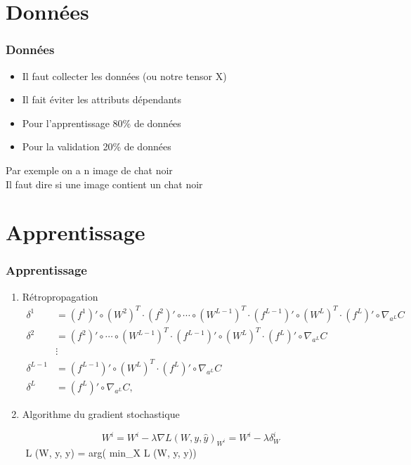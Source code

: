 \documentclass{beamer}
\begin{document}
	\section{Données}

	\begin{frame}
		\frametitle{Données}
		\begin{itemize}
			\item Il faut collecter les données (ou notre tensor X)
			\item Il fait éviter les attributs dépendants
			\item Pour l'apprentissage 80\% de données
			\item Pour la validation 20\% de données
		\end{itemize}
	
		\begin{center}
			Par exemple on a n image de chat noir\\
			Il faut dire si une image contient un chat noir 
		\end{center}
	\end{frame}



		\section{Apprentissage}
	
	\begin{frame}
		\frametitle{Apprentissage}
		\begin{enumerate}
			\item Rétropropagation
		$$	{\displaystyle {\begin{aligned}\delta ^{1}&=(f^{1})'\circ (W^{2})^{T}\cdot (f^{2})'\circ \cdots \circ (W^{L-1})^{T}\cdot (f^{L-1})'\circ (W^{L})^{T}\cdot (f^{L})'\circ \nabla _{a^{L}}C\\\delta ^{2}&=(f^{2})'\circ \cdots \circ (W^{L-1})^{T}\cdot (f^{L-1})'\circ (W^{L})^{T}\cdot (f^{L})'\circ \nabla _{a^{L}}C\\&\vdots \\ \delta ^{L-1}&=(f^{L-1})'\circ (W^{L})^{T}\cdot (f^{L})'\circ \nabla _{a^{L}}C\\\delta ^{L}&=(f^{L})'\circ \nabla _{a^{L}}C,\end{aligned}}}
		$$
			
			\item Algorithme du gradient stochastique
			
			$$ W^i=W^i-\lambda \nabla L(W, y, \hat y)_{W^i} = W^i-\lambda \delta^i_W $$
			$$ L (W, y, \hat y) = arg( min_{X} L (W, y, \hat y))
		\end{enumerate}
	

	\end{frame}
\end{document}

